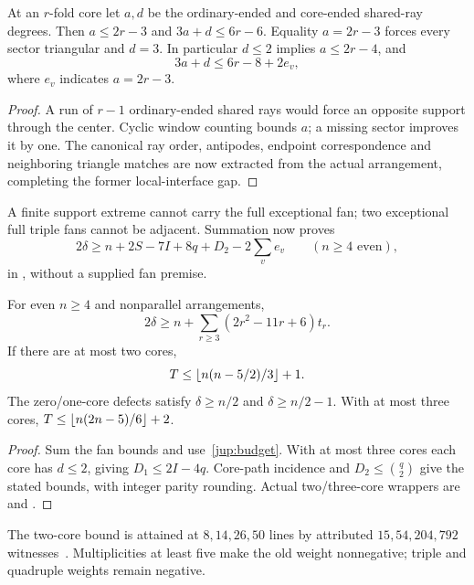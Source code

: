 \begin{lemma}\label{jup:fan}
At an $r$-fold core let $a,d$ be the ordinary-ended and core-ended shared-ray degrees. Then $a\le2r-3$ and $3a+d\le6r-6$. Equality $a=2r-3$ forces every sector triangular and $d=3$. In particular $d\le2$ implies $a\le2r-4$, and
\begin{equation}\label{jup:sharp-fan}
 3a+d\le6r-8+2e_v,
\end{equation}
where $e_v$ indicates $a=2r-3$.
\end{lemma}
\begin{proof}
A run of $r-1$ ordinary-ended shared rays would force an opposite support through the center. Cyclic window counting bounds $a$; a missing sector improves it by one. The canonical ray order, antipodes, endpoint correspondence and neighboring triangle matches are now extracted from the actual arrangement, completing the former local-interface gap.
\end{proof}
A finite support extreme cannot carry the full exceptional fan; two exceptional full triple fans cannot be adjacent. Summation now proves
\begin{equation}\label{jup:exceptional}
 2\delta\ge n+2S-7I+8q+D_2-2\sum_v e_v
 \qquad(n\ge4\text{ even}),
\end{equation}
in , without a supplied fan premise.

\begin{theorem}\label{jup:upper}
For even $n\ge4$ and nonparallel arrangements,
\begin{equation}\label{jup:weighted}
 2\delta\ge n+\sum_{r\ge3}(2r^2-11r+6)t_r.
\end{equation}
If there are at most two cores,
\begin{equation}\label{jup:two-core}
 T\le\left\lfloor n(n-5/2)/3\right\rfloor+1.
\end{equation}
The zero/one-core defects satisfy $\delta\ge n/2$ and $\delta\ge n/2-1$. With at most three cores, $T\le\left\lfloor n(2n-5)/6\right\rfloor+2$.
\end{theorem}
\begin{proof}
Sum the fan bounds and use~\eqref{jup:budget}. With at most three cores each core has $d\le2$, giving $D_1\le2I-4q$. Core-path incidence and $D_2\le\binom q2$ give the stated bounds, with integer parity rounding. Actual two/three-core wrappers are
 and
.
\end{proof}
The two-core bound is attained at $8,14,26,50$ lines by attributed $15,54,204,792$ witnesses~\cite{maiorana2026,parpalakutkinGallery2026}. Multiplicities at least five make the old weight nonnegative; triple and quadruple weights remain negative.

